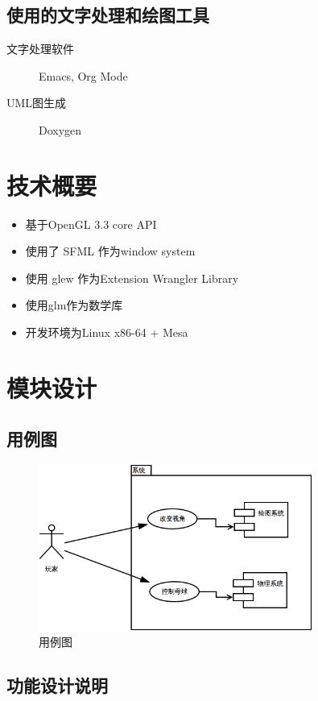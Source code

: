 \documentclass[11pt]{article}
\begin{document}
\subsection{使用的文字处理和绘图工具}
\label{sec-1-4}
\begin{description}
\item[{文字处理软件}] Emacs, Org Mode
\item[{UML图生成}] Doxygen
\end{description}
\section{技术概要}
\label{sec-2}
\begin{itemize}
\item 基于OpenGL 3.3 core API
\item 使用了 SFML 作为window system
\item 使用 glew 作为Extension Wrangler Library
\item 使用glm作为数学库
\item 开发环境为Linux x86-64 + Mesa
\end{itemize}
\section{模块设计}
\label{sec-3}
\subsection{用例图}
\label{sec-3-1}
\begin{figure}[h]
 \centering
 \includegraphics[width=0.8\textwidth]{usecase.png}
 \caption{用例图}
 \label{fig:usecase}
 \end{figure}
\subsection{功能设计说明}
\label{sec-3-2}
\end{document}
